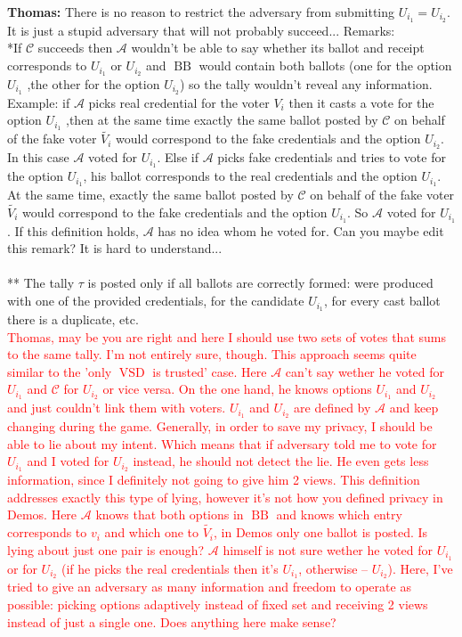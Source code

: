 \documentclass[12pt]{article}
\DeclareMathOperator{\vsd}{VSD}
\DeclareMathOperator{\bb}{BB}
\begin{document}
{\color{red} \textbf{Thomas:} There is no reason to restrict the adversary from submitting $U_{i_1} = U_{i_2}$. It is just a stupid adversary that will not probably succeed...}
Remarks:\\
*If  $\mathcal{C}$ succeeds then $\mathcal{A}$ wouldn't be able to say whether its ballot and receipt corresponds to $U_{i_1}$ or $U_{i_2}$ and $\bb$ would contain both ballots (one for the option $U_{i_1}$ ,the other for the option $ U_{i_2}$) so the tally wouldn't reveal any information. Example: if $\mathcal{A}$  picks real credential for the voter $V_i$ then it casts a vote for the option  $U_{i_1}$ ,then at the same time exactly the same ballot posted by $\mathcal{C}$ on behalf of the fake voter $\tilde{V_i}$ would correspond to the fake credentials and the option $U_{i_2}$. In this case $\mathcal{A}$  voted for $U_{i_1}$. Else if $\mathcal{A}$ picks fake credentials and tries to vote for the option $U_{i_1}$,  his ballot corresponds to the real credentials and  the option $U_{i_1}$. At the same time, exactly the same ballot posted by $\mathcal{C}$ on behalf of the fake voter $\tilde{V_i}$ would correspond to the fake credentials  and the option $U_{i_1}$. So $\mathcal{A}$  voted for $U_{i_1}$. If this definition holds,  $\mathcal{A}$ has no idea whom he voted for. {\color{red}Can you maybe edit this remark? It is hard to understand...} \\\\
** The tally $\tau$ is posted only if all ballots are correctly formed: were produced with one of the provided credentials, for the candidate $U_{i_1}$, for every cast ballot there is a duplicate, etc. \\
\textcolor{red}{Thomas, may be you are right and here I should use two sets of votes that sums to the same tally. I'm not entirely sure, though. This approach seems quite similar to the 'only $\vsd$ is trusted' case.  Here $\mathcal{A}$ can't say wether he voted for $U_{i_1}$ and $\mathcal{C}$ for $U_{i_2}$ or vice versa. On the one hand, he knows options $U_{i_1}$  and $U_{i_2}$ and just couldn't link them with voters.  $U_{i_1}$ and $U_{i_2}$ are defined by $\mathcal{A}$ and keep changing during the game. Generally, in order to save my privacy, I should be able to lie about my intent. Which means that if adversary told me to vote for  $U_{i_1}$  and I voted for $U_{i_2}$ instead, he should not detect the lie. He even gets less information, since I definitely not going to give him 2 views. This definition addresses exactly this type of lying, however it's not how you defined privacy in Demos. Here $\mathcal{A}$ knows that both options in $\bb$ and knows which entry corresponds to $v_i$ and which one to $\tilde{V_i}$, in Demos only one ballot is posted. Is lying about just one pair is enough? $\mathcal{A}$ himself is not sure wether he voted for $U_{i_1}$ or  for $U_{i_2}$ (if he picks the real credentials then it's $U_{i_1}$, otherwise --  $U_{i_2}$). Here, I've tried to give an adversary as many information and freedom to operate as possible: picking options adaptively instead of fixed set and receiving 2 views instead of just a single one. Does anything here make sense?}
\end{document}
